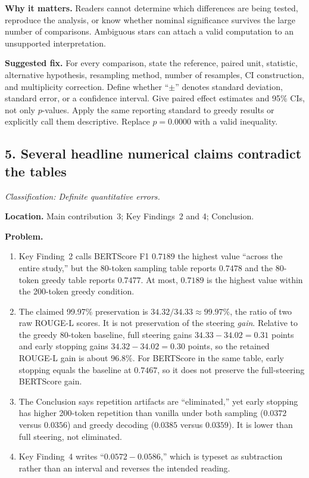 \documentclass[11pt]{article}
\newcommand{\findinglabel}[1]{\textbf{#1}}
\newcommand{\classification}[1]{\textit{Classification: #1.}}
\begin{document}
\findinglabel{Why it matters.} Readers cannot determine which differences are being tested, reproduce the analysis, or know whether nominal significance survives the large number of comparisons.  Ambiguous stars can attach a valid computation to an unsupported interpretation.

\findinglabel{Suggested fix.} For every comparison, state the reference, paired unit, statistic, alternative hypothesis, resampling method, number of resamples, CI construction, and multiplicity correction.  Define whether ``$\pm$'' denotes standard deviation, standard error, or a confidence interval.  Give paired effect estimates and 95\% CIs, not only $p$-values.  Apply the same reporting standard to greedy results or explicitly call them descriptive.  Replace $p=0.0000$ with a valid inequality.

\subsection*{5. Several headline numerical claims contradict the tables}

\classification{Definite quantitative errors}

\findinglabel{Location.} Main contribution~3; Key Findings~2 and 4; Conclusion.

\findinglabel{Problem.}
\begin{enumerate}
    \item Key Finding~2 calls BERTScore F1 $0.7189$ the highest value ``across the entire study,'' but the 80-token sampling table reports $0.7478$ and the 80-token greedy table reports $0.7477$.  At most, $0.7189$ is the highest value within the 200-token greedy condition.
    \item The claimed 99.97\% preservation is $34.32/34.33\approx99.97\%$, the ratio of two raw ROUGE-L scores.  It is not preservation of the steering \emph{gain}.  Relative to the greedy 80-token baseline, full steering gains $34.33-34.02=0.31$ points and early stopping gains $34.32-34.02=0.30$ points, so the retained ROUGE-L gain is about $96.8\%$.  For BERTScore in the same table, early stopping equals the baseline at $0.7467$, so it does not preserve the full-steering BERTScore gain.
    \item The Conclusion says repetition artifacts are ``eliminated,'' yet early stopping has higher 200-token repetition than vanilla under both sampling ($0.0372$ versus $0.0356$) and greedy decoding ($0.0385$ versus $0.0359$).  It is lower than full steering, not eliminated.
    \item Key Finding~4 writes ``$0.0572 - 0.0586$,'' which is typeset as subtraction rather than an interval and reverses the intended reading.
\end{enumerate}
\end{document}
